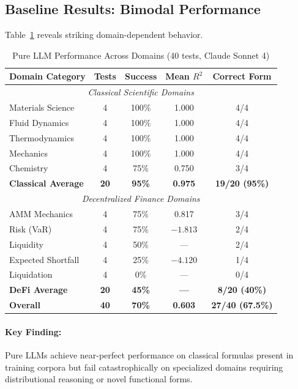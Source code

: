 \documentclass[twoside,11pt]{article}
\begin{document}
\subsection{Baseline Results: Bimodal Performance}

Table~\ref{tab:baseline_llm} reveals striking domain-dependent behavior.

\begin{table}[htbp]
\centering
\caption{Pure LLM Performance Across Domains (40 tests, Claude Sonnet 4)}
\label{tab:baseline_llm}
\begin{tabular}{@{}lcccc@{}}
\toprule
\textbf{Domain Category} & \textbf{Tests} & \textbf{Success} & \textbf{Mean $R^2$} & \textbf{Correct Form} \\
\midrule
\multicolumn{5}{c}{\textit{Classical Scientific Domains}} \\
\midrule
Materials Science & 4 & 100\% & 1.000 & 4/4 \\
Fluid Dynamics & 4 & 100\% & 1.000 & 4/4 \\
Thermodynamics & 4 & 100\% & 1.000 & 4/4 \\
Mechanics & 4 & 100\% & 1.000 & 4/4 \\
Chemistry & 4 & 75\% & 0.750 & 3/4 \\
\midrule
\textbf{Classical Average} & \textbf{20} & \textbf{95\%} & \textbf{0.975} & \textbf{19/20 (95\%)} \\
\midrule
\multicolumn{5}{c}{\textit{Decentralized Finance Domains}} \\
\midrule
AMM Mechanics & 4 & 75\% & 0.817 & 3/4 \\
Risk (VaR) & 4 & 75\% & $-1.813$ & 2/4 \\
Liquidity & 4 & 50\% & --- & 2/4 \\
Expected Shortfall & 4 & 25\% & $-4.120$ & 1/4 \\
Liquidation & 4 & 0\% & --- & 0/4 \\
\midrule
\textbf{DeFi Average} & \textbf{20} & \textbf{45\%} & \textbf{---} & \textbf{8/20 (40\%)} \\
\midrule
\midrule
\textbf{Overall} & \textbf{40} & \textbf{70\%} & \textbf{0.603} & \textbf{27/40 (67.5\%)} \\
\bottomrule
\end{tabular}
\end{table}

\paragraph{Key Finding:} Pure LLMs achieve near-perfect performance on classical formulas present in training corpora but fail catastrophically on specialized domains requiring distributional reasoning or novel functional forms.
\end{document}

